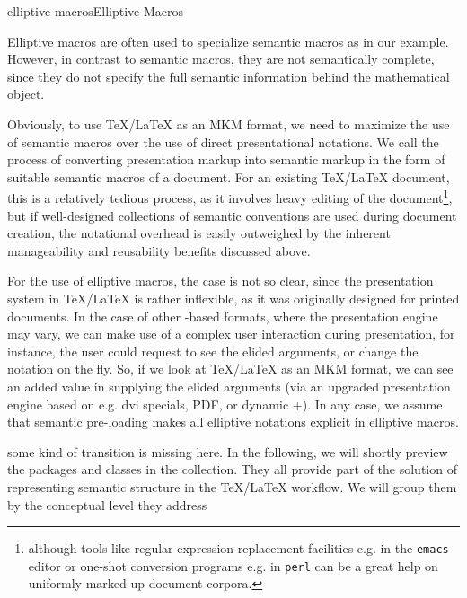 \begin{description}
\begin{myfig}{elliptive-macros}{Elliptive Macros}\footnotesize
\begin{boxedverbatim}
\def\interpret#1#2#3{{\left[\kern-0.18em\left[#1\right]\kern-0.18em\right]^{#2}_{#3}}}
\def\intermp#1{\interpret{#1}{{\cal M}}{\phi}}
\def\interm#1{\interpret{#1}{{\cal M}}{}}
\def\interp#1{\interpret{#1}{}{\phi}}
\def\interoo#1{\interpret{#1}{}{}}
\end{boxedverbatim}  
\end{myfig}
Elliptive macros are often used to specialize semantic macros as in our example.
However, in contrast to semantic macros, they are not semantically complete, since
they do not specify the full semantic information behind the mathematical object.
\end{description}

Obviously, to use {\TeX/\LaTeX} as an MKM format, we need to maximize the use of semantic
macros over the use of direct presentational notations. We call the process of converting
presentation markup into semantic markup in the form of suitable semantic macros
{} of a document. For an existing {\TeX/\LaTeX} document,
this is a relatively tedious process, as it involves heavy editing of the
document\footnote{although tools like regular expression replacement facilities e.g. in
  the {\tt{emacs}} editor or one-shot conversion programs e.g. in {\tt{perl}} can be a
  great help on uniformly marked up document corpora.}, but if well-designed collections
of semantic conventions are used during document creation, the notational overhead is
easily outweighed by the inherent manageability and reusability benefits discussed above.

For the use of elliptive macros, the case is not so clear, since the presentation system
in {\TeX/\LaTeX} is rather inflexible, as it was originally designed for printed
documents. In the case of other {\xml}-based formats, where the presentation engine may
vary, we can make use of a complex user interaction during presentation, for instance, the
user could request to see the elided arguments, or change the notation on the fly. So, if
we look at {\TeX/\LaTeX} as an MKM format, we can see an added value in supplying the
elided arguments (via an upgraded presentation engine based on e.g. dvi specials, PDF, or
dynamic {\xhtml}+{\mathml}). In any case, we assume that semantic pre-loading makes all
elliptive notations explicit in elliptive macros.

\begin{oldpart}{some kind of transition is missing here. }
  In the following, we will shortly preview the packages and classes in the {\stex}
  collection. They all provide part of the solution of representing semantic structure in
  the {\TeX/\LaTeX} workflow. We will group them by the conceptual level they
  address
\end{oldpart}

